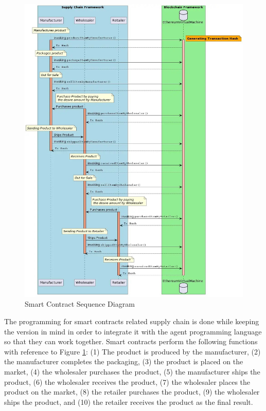 \vspace{.5cm}

    \begin{figure}[h]
    \centering
      \includegraphics[width=15cm]{includes/figures/Sequence Diagram.jpg} 
      \caption{Smart Contract Sequence Diagram}
      \label{Smart Contract Sequence Diagram}
    \end{figure}
    
\vspace{.5cm}

The programming for smart contracts related supply chain is done while keeping the version in mind in order to integrate it with the agent programming language so that they can work together. Smart contracts perform the following functions with reference to Figure \ref{Smart Contract Sequence Diagram}: (1) The product is produced by the manufacturer, (2) the manufacturer completes the packaging, (3) the product is placed on the market, (4) the wholesaler purchases the product, (5) the manufacturer ships the product, (6) the wholesaler receives the product, (7) the wholesaler places the product on the market, (8) the retailer purchases the product, (9) the wholesaler ships the product, and (10) the retailer receives the product as the final result.

